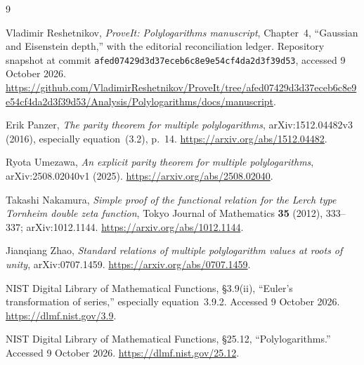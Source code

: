 \documentclass[11pt,a4paper]{article}
\numberwithin{equation}{section}
\theoremstyle{definition}
\theoremstyle{remark}
\begin{document}
\begin{thebibliography}{9}
\raggedright
{}
Vladimir Reshetnikov, \emph{ProveIt: Polylogarithms manuscript}, Chapter~4, ``Gaussian and Eisenstein depth,'' with the editorial reconciliation ledger. Repository snapshot at commit \texttt{afed07429d3d37eceb6c8e9e54cf4da2d3f39d53}, accessed 9 October 2026.
\url{https://github.com/VladimirReshetnikov/ProveIt/tree/afed07429d3d37eceb6c8e9e54cf4da2d3f39d53/Analysis/Polylogarithms/docs/manuscript}.

Erik Panzer, \emph{The parity theorem for multiple polylogarithms}, arXiv:1512.04482v3 (2016), especially equation~(3.2), p.~14.
\url{https://arxiv.org/abs/1512.04482}.

Ryota Umezawa, \emph{An explicit parity theorem for multiple polylogarithms}, arXiv:2508.02040v1 (2025).
\url{https://arxiv.org/abs/2508.02040}.

Takashi Nakamura, \emph{Simple proof of the functional relation for the Lerch type Tornheim double zeta function}, Tokyo Journal of Mathematics \textbf{35} (2012), 333--337; arXiv:1012.1144.
\url{https://arxiv.org/abs/1012.1144}.

Jianqiang Zhao, \emph{Standard relations of multiple polylogarithm values at roots of unity}, arXiv:0707.1459.
\url{https://arxiv.org/abs/0707.1459}.

NIST Digital Library of Mathematical Functions, \S3.9(ii), ``Euler's transformation of series,'' especially equation~3.9.2. Accessed 9 October 2026.
\url{https://dlmf.nist.gov/3.9}.

NIST Digital Library of Mathematical Functions, \S25.12, ``Polylogarithms.'' Accessed 9 October 2026.
\url{https://dlmf.nist.gov/25.12}.
\end{thebibliography}
\end{document}
